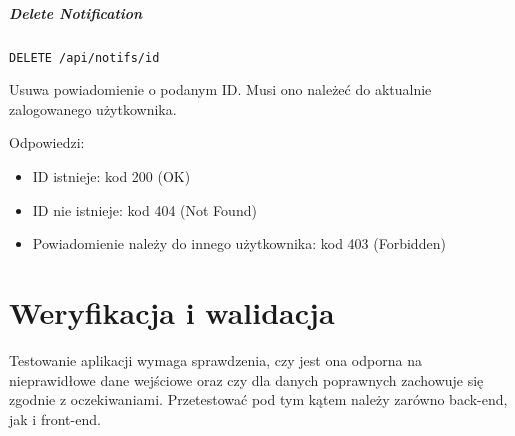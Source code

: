 \documentclass[a4paper,twoside,12pt]{book}
\begin{document}
\paragraph{Delete Notification}

\texttt{DELETE /api/notifs/{id}}

Usuwa powiadomienie o podanym ID. Musi ono należeć do aktualnie zalogowanego użytkownika.

Odpowiedzi: 
\begin{itemize}
	\item ID istnieje: kod 200 (OK) 
	\item ID nie istnieje: kod 404 (Not Found)
	\item Powiadomienie należy do innego użytkownika: kod 403 (Forbidden)
\end{itemize}

%      




\chapter{Weryfikacja i walidacja}
\label{ch:06}

Testowanie aplikacji wymaga sprawdzenia, czy jest ona odporna na nieprawidłowe dane wejściowe oraz czy dla danych poprawnych zachowuje się zgodnie z oczekiwaniami. Przetestować pod tym kątem należy zarówno back-end, jak i front-end.
\end{document}
